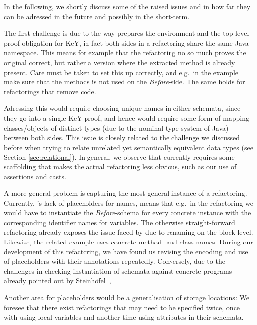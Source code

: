 In the following, we shortly discuss some of the raised issues and in how far they can be adressed in the future and possibly in the short-term.

The first challenge is due to the way \Refinity{} prepares the environment and the top-level proof obligation for KeY,
in fact both sides in a refactoring share the same Java namespace.
This means for example that the  refactoring no so much proves the original correct, but rather a version where the extracted method is already present.
Care must be taken to set this up correctly, and e.g.\ in the  example make sure that the methods is not used on the \textit{Before}-side.
The same holds for refactorings that remove code.

Adressing this would require choosing unique names in either schemata, since they go into a single KeY-proof, and hence would require some form of mapping classes/objects of distinct types (due to the nominal type system of Java) between both sides.
This issue is closely related to the challenge we discussed before when trying to relate unrelated yet semantically equivalent data types (see Section \ref{sec:relational}).
In general, we observe that currently \Refinity{} requires some scaffolding that makes the actual refactoring less obvious,
such as our use of assertions and casts.

A more general problem is capturing the most general instance of a refactoring.
Currently, \Refinity{}'s lack of placeholders for names, means that e.g.\ in the  refactoring we would have to instantiate the \textit{Before}-schema for every concrete instance with the corresponding identifier names for variables.
The otherwise straight-forward refactoring  already exposes the issue faced by \Refinity{} due to renaming on the block-level.
Likewise, the related  example uses concrete method- and class names.
During our development of this refactoring, we have found us revising the encoding and use of placeholders with their annotations repeatedly.
Conversely, due to the challenges in checking instantiation of schemata against concrete programs already pointed out by Steinhöfel~\cite[119,137]{steinhoefel-20},

Another area for placeholders would be a generalisation of storage locations:
We foresee that there exist refactorings that may need to be specified twice, once with using local variables and another time using attributes in their schemata.

